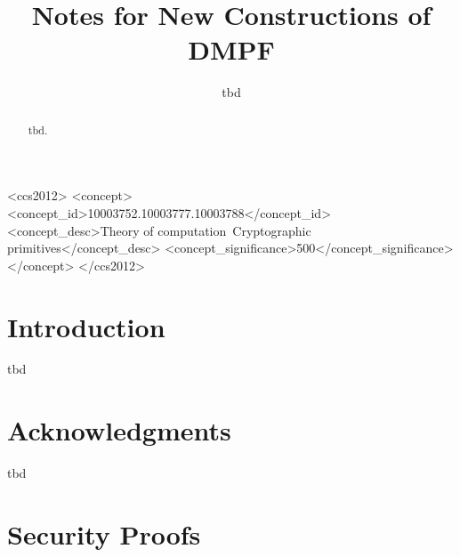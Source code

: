 \documentclass[sigconf]{acmart}
\begin{document}
\title{Notes for New Constructions of DMPF}

\author{tbd}

\renewcommand{\shortauthors}{tbd}

\begin{abstract}
  tbd. 
\end{abstract}

\begin{CCSXML}
  <ccs2012>
     <concept>
         <concept_id>10003752.10003777.10003788</concept_id>
         <concept_desc>Theory of computation~Cryptographic primitives</concept_desc>
         <concept_significance>500</concept_significance>
         </concept>
   </ccs2012>
\end{CCSXML}
  



\maketitle

\section{Introduction}
tbd





\newpage



\section{Acknowledgments}
tbd






\appendix
\section{Security Proofs}
\end{document}
